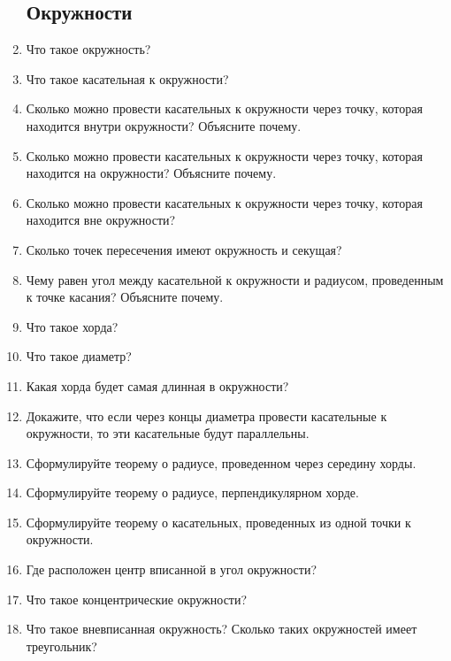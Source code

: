 \documentclass[12pt, a4paper]{article}
\begin{document}
\begin{enumerate}
	\subsection{Окружности}
	\item Что такое окружность?
	\item Что такое касательная к окружности?
	\item Сколько можно провести касательных к окружности через точку, которая находится внутри окружности? Объясните почему.
	\item Сколько можно провести касательных к окружности через точку, которая находится на окружности? Объясните почему.
	\item Сколько можно провести касательных к окружности через точку, которая находится вне окружности? 
	\item Сколько точек пересечения имеют окружность и секущая?
	\item Чему равен угол между касательной к окружности и радиусом, проведенным к точке касания? Объясните почему.
	\item Что такое хорда?
	\item Что такое диаметр?
	\item Какая хорда будет самая длинная в окружности?
	\item Докажите, что если через концы диаметра провести касательные к окружности, то эти касательные будут параллельны.
	\item Сформулируйте теорему о радиусе, проведенном через середину хорды.
	\item Сформулируйте теорему о радиусе, перпендикулярном хорде.
	\item Сформулируйте теорему о касательных, проведенных из одной точки к окружности.
	\item Где расположен центр вписанной в угол окружности?
	\item Что такое концентрические окружности?
	\item Что такое вневписанная окружность? Сколько таких окружностей имеет треугольник?
\end{enumerate}
\end{document}
